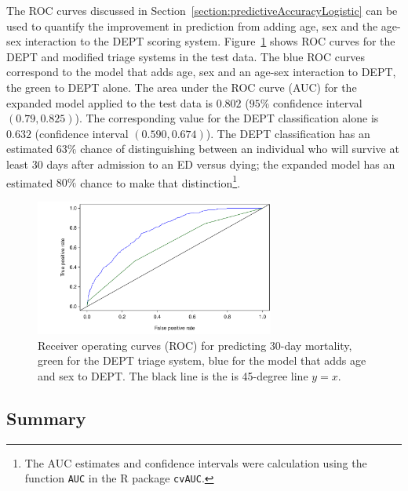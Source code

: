 The ROC curves discussed in Section~\ref{section:predictiveAccuracyLogistic} can be used to quantify the improvement in prediction from adding age, sex and the age-sex interaction to the DEPT scoring system.   Figure~\ref{figure:ROCDanishED} shows ROC curves for the DEPT and modified triage systems in the test data.  The blue ROC curves correspond to the model that adds age, sex and an age-sex interaction to DEPT, the green to DEPT alone.   The area under the ROC curve (AUC) for the expanded model applied to the test data is $0.802$ ($95\%$ confidence interval $(0.79, 0.825)$). The corresponding value for the DEPT classification alone is $0.632$ (confidence interval $(0.590,0.674)$).  The DEPT classification has an estimated $63\%$ chance of distinguishing between an individual who will survive at least 30 days after admission to an ED versus dying; the expanded model has an estimated $80\%$ chance to make that distinction\footnote{The AUC estimates and confidence intervals were calculation using the function \texttt{AUC} in the \textsf{R} package \texttt{cvAUC}.}.

\begin{figure}[!tbh]
  \centering
  \includegraphics[width=0.70\textwidth]
  {ch_logistic_regression_oi_biostat/figures/ROCDanishED/ROCDanishED.pdf}
    \caption{Receiver operating curves (ROC) for predicting 30-day mortality,  green for the DEPT triage system, blue for the model that adds age and sex to DEPT\@.  The black line is the is 45-degree line $y = x$.}
    \label{figure:ROCDanishED}
\end{figure}

\textD{\newpage}

\subsection{Summary}
\label{section:interpretationNewColorScore}

